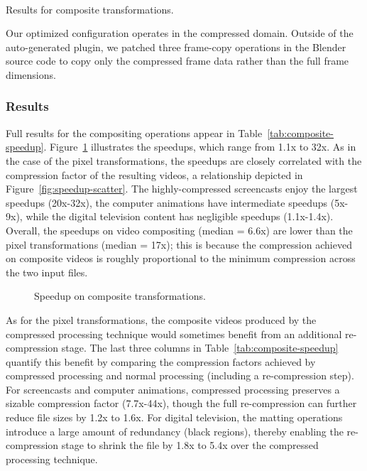 \begin{table*}[t]
\vspace{-1.5\baselineskip}
\begin{minipage}{0.6in}
\mbox{~}
\end{minipage}
\caption{Results for composite transformations.
\protect\label{tab:composite-speedup}}
\end{table*}

Our optimized configuration operates in the compressed domain.
Outside of the auto-generated plugin, we patched three frame-copy
operations in
the Blender source code to copy only the compressed frame data rather
than the full frame dimensions.

\subsubsection{Results}

Full results for the compositing operations appear in
Table~\ref{tab:composite-speedup}.  Figure~\ref{fig:composite-speedup}
illustrates the speedups, which range from 1.1x to 32x.  As in the
case of the pixel transformations, the speedups are closely correlated
with the compression factor of the resulting videos, a relationship
depicted in Figure~\ref{fig:speedup-scatter}.  The highly-compressed
screencasts enjoy the largest speedups (20x-32x), the computer
animations have intermediate speedups (5x-9x), while the digital
television content has negligible speedups (1.1x-1.4x).  Overall, the
speedups on video compositing (median = 6.6x) are lower than the pixel
transformations (median = 17x); this is because the compression
achieved on composite videos is roughly proportional to the minimum
compression across the two input files.

\begin{figure}[t]
\caption{Speedup on composite transformations.
\protect\label{fig:composite-speedup}}
\end{figure}

As for the pixel transformations, the composite videos produced by the
compressed processing technique would sometimes benefit from an
additional re-compression stage.  The last three columns in
Table~\ref{tab:composite-speedup} quantify this benefit by comparing
the compression factors achieved by compressed processing and normal
processing (including a re-compression step).  For screencasts and
computer animations, compressed processing preserves a sizable
compression factor (7.7x-44x), though the full re-compression can
further reduce file sizes by 1.2x to 1.6x.  For digital television,
the matting operations introduce a large amount of redundancy (black
regions), thereby enabling the re-compression stage to shrink the file
by 1.8x to 5.4x over the compressed processing technique.

